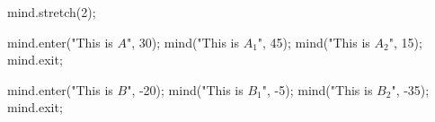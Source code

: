 \usemodule[mindmap]
\startMPpage
mind.stretch(2);

mind.enter("This is $A$", 30);
    mind("This is $A_1$", 45);
    mind("This is $A_2$", 15);
mind.exit;

mind.enter("This is $B$", -20);
    mind("This is $B_1$", -5);
    mind("This is $B_2$", -35);
mind.exit;
\stopMPpage
